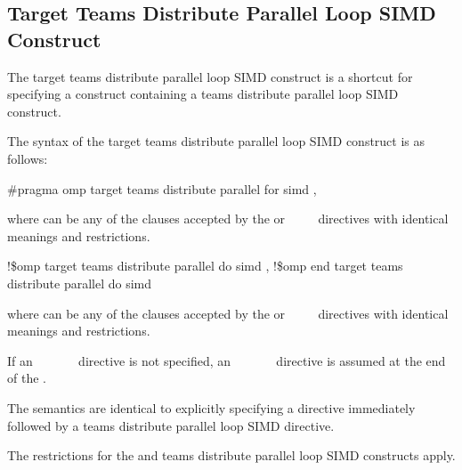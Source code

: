 \subsection{Target Teams Distribute Parallel Loop SIMD Construct}
\label{subsec:Target Teams Distribute Parallel Loop SIMD Construct}
\summary
The target teams distribute parallel loop SIMD construct is a shortcut for specifying a  
construct containing a teams distribute parallel loop SIMD construct.

\syntax
The syntax of the target teams distribute parallel loop SIMD construct is as follows:

\ccppspecificstart
{\small
\begin{boxedcode}
\#pragma omp target teams distribute parallel for simd \plc{[clause[ [},\plc{] clause] ... ]}
\end{boxedcode}}

where  can be any of the clauses accepted by the  or 
~~~~
directives with identical meanings and restrictions.
\ccppspecificend

\fortranspecificstart
\begin{boxedcode}
!\$omp target teams distribute parallel do simd \plc{[clause[ [},\plc{] clause] ... ]}
\plc{[}!\$omp end target teams distribute parallel do simd\plc{]}
\end{boxedcode}

where  can be any of the clauses accepted by the 
 or ~~~~
directives with identical meanings and restrictions.

If an ~~~~~~ 
directive is not specified, an 
~~~~~~ 
directive is assumed at the end of the .
\fortranspecificend

\descr
The semantics are identical to explicitly specifying a  directive immediately 
followed by a teams distribute parallel loop SIMD directive.

\restrictions
The restrictions for the  and teams distribute parallel loop SIMD constructs apply.

